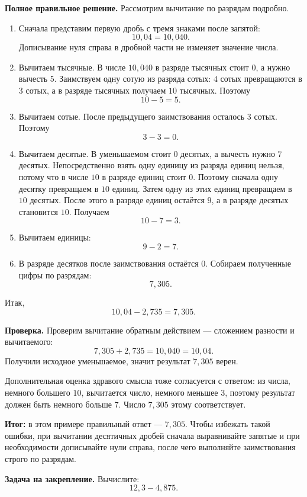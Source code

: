 \documentclass[12pt,a4paper]{article}
\begin{document}
\textbf{Полное правильное решение.}
Рассмотрим вычитание по разрядам подробно.

\begin{enumerate}
  \item Сначала представим первую дробь с тремя знаками после запятой:
  \[
  10{,}04=10{,}040.
  \]
  Дописывание нуля справа в дробной части не изменяет значение числа.

  \item Вычитаем тысячные. В числе $10{,}040$ в разряде тысячных стоит $0$, а нужно вычесть $5$. Заимствуем одну сотую из разряда сотых: $4$ сотых превращаются в $3$ сотых, а в разряде тысячных получаем $10$ тысячных. Поэтому
  \[
  10-5=5.
  \]

  \item Вычитаем сотые. После предыдущего заимствования осталось $3$ сотых. Поэтому
  \[
  3-3=0.
  \]

  \item Вычитаем десятые. В уменьшаемом стоит $0$ десятых, а вычесть нужно $7$ десятых. Непосредственно взять одну единицу из разряда единиц нельзя, потому что в числе $10$ в разряде единиц стоит $0$. Поэтому сначала одну десятку превращаем в $10$ единиц. Затем одну из этих единиц превращаем в $10$ десятых. После этого в разряде единиц остаётся $9$, а в разряде десятых становится $10$. Получаем
  \[
  10-7=3.
  \]

  \item Вычитаем единицы:
  \[
  9-2=7.
  \]

  \item В разряде десятков после заимствования остаётся $0$. Собираем полученные цифры по разрядам:
  \[
  7{,}305.
  \]
\end{enumerate}

Итак,
\[
\boxed{10{,}04-2{,}735=7{,}305}.
\]

\textbf{Проверка.}
Проверим вычитание обратным действием --- сложением разности и вычитаемого:
\[
7{,}305+2{,}735=10{,}040=10{,}04.
\]
Получили исходное уменьшаемое, значит результат $7{,}305$ верен.

Дополнительная оценка здравого смысла тоже согласуется с ответом: из числа, немного большего $10$, вычитается число, немного меньшее $3$, поэтому результат должен быть немного больше $7$. Число $7{,}305$ этому соответствует.

\textcolor{teal!60!black}{\textbf{Итог:}}
в этом примере правильный ответ --- $7{,}305$. Чтобы избежать такой ошибки, при вычитании десятичных дробей сначала выравнивайте запятые и при необходимости дописывайте нули справа, после чего выполняйте заимствования строго по разрядам.

\textbf{Задача на закрепление.}
Вычислите:
\[
12{,}3-4{,}875.
\]
\end{document}
